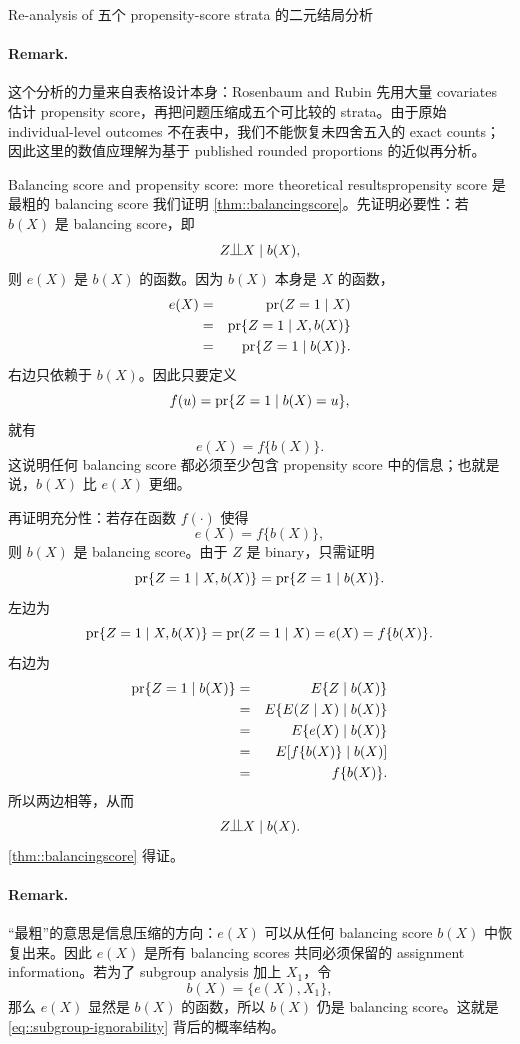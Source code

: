 \begin{exercisesolution}{Re-analysis of \citet{Rosenbaum::1983JRSSB}}{五个 propensity-score strata 的二元结局分析}
\paragraph{Remark.}
这个分析的力量来自表格设计本身：Rosenbaum and Rubin 先用大量 covariates 估计 propensity score，再把问题压缩成五个可比较的 strata。由于原始 individual-level outcomes 不在表中，我们不能恢复未四舍五入的 exact counts；因此这里的数值应理解为基于 published rounded proportions 的近似再分析。
\end{exercisesolution}

\begin{exercisesolution}{Balancing score and propensity score: more theoretical results}{propensity score 是最粗的 balancing score}
我们证明 \cref{thm::balancingscore}。先证明必要性：若 $b(X)$ 是 balancing score，即
\[
Z\ind X\mid b(X),
\]
则 $e(X)$ 是 $b(X)$ 的函数。因为 $b(X)$ 本身是 $X$ 的函数，
\begin{eqnarray*}
e(X)
&=&\textup{pr}(Z=1\mid X)\\
&=&\textup{pr}\{Z=1\mid X,b(X)\}\\
&=&\textup{pr}\{Z=1\mid b(X)\}.
\end{eqnarray*}
右边只依赖于 $b(X)$。因此只要定义
\[
f(u)=\textup{pr}\{Z=1\mid b(X)=u\},
\]
就有
\[
e(X)=f\{b(X)\}.
\]
这说明任何 balancing score 都必须至少包含 propensity score 中的信息；也就是说，$b(X)$ 比 $e(X)$ 更细。

再证明充分性：若存在函数 $f(\cdot)$ 使得
\[
e(X)=f\{b(X)\},
\]
则 $b(X)$ 是 balancing score。由于 $Z$ 是 binary，只需证明
\[
\textup{pr}\{Z=1\mid X,b(X)\}=\textup{pr}\{Z=1\mid b(X)\}.
\]
左边为
\[
\textup{pr}\{Z=1\mid X,b(X)\}=\textup{pr}(Z=1\mid X)=e(X)=f\{b(X)\}.
\]
右边为
\begin{eqnarray*}
\textup{pr}\{Z=1\mid b(X)\}
&=&E\{Z\mid b(X)\}\\
&=&E\{E(Z\mid X)\mid b(X)\}\\
&=&E\{e(X)\mid b(X)\}\\
&=&E[f\{b(X)\}\mid b(X)]\\
&=&f\{b(X)\}.
\end{eqnarray*}
所以两边相等，从而
\[
Z\ind X\mid b(X).
\]
\cref{thm::balancingscore} 得证。

\paragraph{Remark.}
``最粗''的意思是信息压缩的方向：$e(X)$ 可以从任何 balancing score $b(X)$ 中恢复出来。因此 $e(X)$ 是所有 balancing scores 共同必须保留的 assignment information。若为了 subgroup analysis 加上 $X_1$，令
\[
b(X)=\{e(X),X_1\},
\]
那么 $e(X)$ 显然是 $b(X)$ 的函数，所以 $b(X)$ 仍是 balancing score。这就是 \cref{eq::subgroup-ignorability} 背后的概率结构。
\end{exercisesolution}

